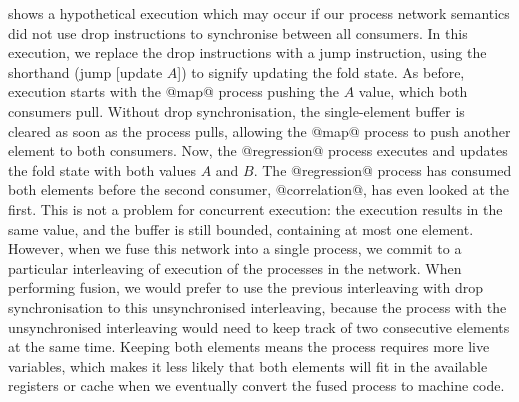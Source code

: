  shows a hypothetical execution which may occur if our process network semantics did not use drop instructions to synchronise between all consumers.
In this execution, we replace the drop instructions with a jump instruction, using the shorthand (jump [update $A$]) to signify updating the fold state.
As before, execution starts with the @map@ process pushing the $A$ value, which both consumers pull.
Without drop synchronisation, the single-element buffer is cleared as soon as the process pulls, allowing the @map@ process to push another element to both consumers.
Now, the @regression@ process executes and updates the fold state with both values $A$ and $B$.
The @regression@ process has consumed both elements before the second consumer, @correlation@, has even looked at the first.
This is not a problem for concurrent execution: the execution results in the same value, and the buffer is still bounded, containing at most one element.
However, when we fuse this network into a single process, we commit to a particular interleaving of execution of the processes in the network.
When performing fusion, we would prefer to use the previous interleaving with drop synchronisation to this unsynchronised interleaving, because the process with the unsynchronised interleaving would need to keep track of two consecutive elements at the same time.
Keeping both elements means the process requires more live variables, which makes it less likely that both elements will fit in the available registers or cache when we eventually convert the fused process to machine code.

% 
% 

